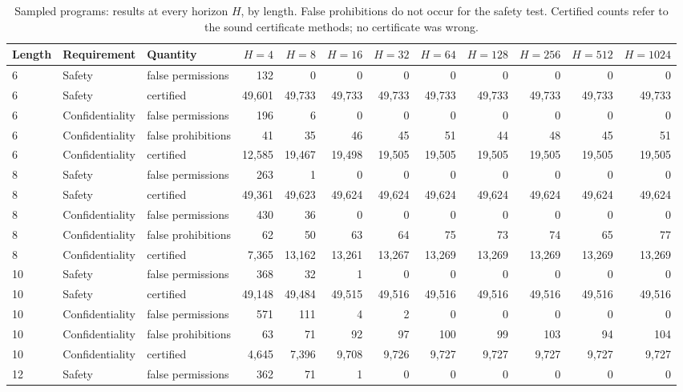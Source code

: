 \documentclass[11pt]{article}
\begin{document}
\begin{table}[tbp]\centering\scriptsize
\caption{Sampled programs: results at every horizon $H$, by length. False prohibitions do not occur for the safety test. Certified counts refer to the sound certificate methods; no certificate was wrong.}
\label{tab:S1sampled}
\setlength{\tabcolsep}{2.4pt}
\begin{tabular}{lllrrrrrrrrr}
\toprule
Length & Requirement & Quantity & $H{=}4$ & $H{=}8$ & $H{=}16$ & $H{=}32$ & $H{=}64$ & $H{=}128$ & $H{=}256$ & $H{=}512$ & $H{=}1024$\\
\midrule
6 & Safety & false permissions & 132 & 0 & 0 & 0 & 0 & 0 & 0 & 0 & 0\\
6 & Safety & certified & 49,601 & 49,733 & 49,733 & 49,733 & 49,733 & 49,733 & 49,733 & 49,733 & 49,733\\
6 & Confidentiality & false permissions & 196 & 6 & 0 & 0 & 0 & 0 & 0 & 0 & 0\\
6 & Confidentiality & false prohibitions & 41 & 35 & 46 & 45 & 51 & 44 & 48 & 45 & 51\\
6 & Confidentiality & certified & 12,585 & 19,467 & 19,498 & 19,505 & 19,505 & 19,505 & 19,505 & 19,505 & 19,505\\
8 & Safety & false permissions & 263 & 1 & 0 & 0 & 0 & 0 & 0 & 0 & 0\\
8 & Safety & certified & 49,361 & 49,623 & 49,624 & 49,624 & 49,624 & 49,624 & 49,624 & 49,624 & 49,624\\
8 & Confidentiality & false permissions & 430 & 36 & 0 & 0 & 0 & 0 & 0 & 0 & 0\\
8 & Confidentiality & false prohibitions & 62 & 50 & 63 & 64 & 75 & 73 & 74 & 65 & 77\\
8 & Confidentiality & certified & 7,365 & 13,162 & 13,261 & 13,267 & 13,269 & 13,269 & 13,269 & 13,269 & 13,269\\
10 & Safety & false permissions & 368 & 32 & 1 & 0 & 0 & 0 & 0 & 0 & 0\\
10 & Safety & certified & 49,148 & 49,484 & 49,515 & 49,516 & 49,516 & 49,516 & 49,516 & 49,516 & 49,516\\
10 & Confidentiality & false permissions & 571 & 111 & 4 & 2 & 0 & 0 & 0 & 0 & 0\\
10 & Confidentiality & false prohibitions & 63 & 71 & 92 & 97 & 100 & 99 & 103 & 94 & 104\\
10 & Confidentiality & certified & 4,645 & 7,396 & 9,708 & 9,726 & 9,727 & 9,727 & 9,727 & 9,727 & 9,727\\
12 & Safety & false permissions & 362 & 71 & 1 & 0 & 0 & 0 & 0 & 0 & 0\\

\end{tabular}
\end{table}
\end{document}
